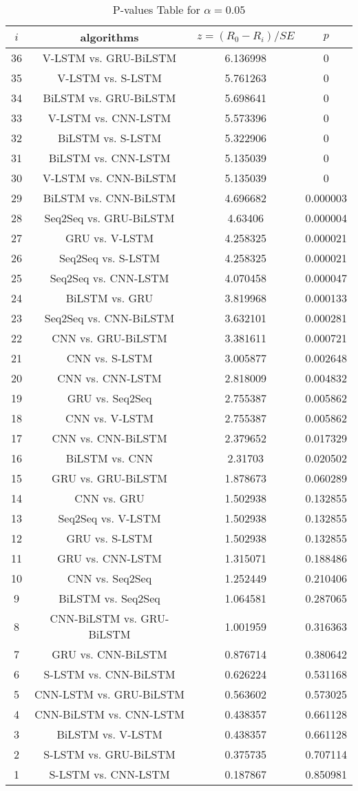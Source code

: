 \documentclass[a4paper,10pt]{article}
\begin{document}
\begin{landscape}
\begin{table}[!htp]
\centering\scriptsize
\begin{tabular}{cccc}
$i$&algorithms&$z=(R_0 - R_i)/SE$&$p$\\
\hline36&V-LSTM vs. GRU-BiLSTM&6.136998&0\\
35&V-LSTM vs. S-LSTM&5.761263&0\\
34&BiLSTM vs. GRU-BiLSTM&5.698641&0\\
33&V-LSTM vs. CNN-LSTM&5.573396&0\\
32&BiLSTM vs. S-LSTM&5.322906&0\\
31&BiLSTM vs. CNN-LSTM&5.135039&0\\
30&V-LSTM vs. CNN-BiLSTM&5.135039&0\\
29&BiLSTM vs. CNN-BiLSTM&4.696682&0.000003\\
28&Seq2Seq vs. GRU-BiLSTM&4.63406&0.000004\\
27&GRU vs. V-LSTM&4.258325&0.000021\\
26&Seq2Seq vs. S-LSTM&4.258325&0.000021\\
25&Seq2Seq vs. CNN-LSTM&4.070458&0.000047\\
24&BiLSTM vs. GRU&3.819968&0.000133\\
23&Seq2Seq vs. CNN-BiLSTM&3.632101&0.000281\\
22&CNN vs. GRU-BiLSTM&3.381611&0.000721\\
21&CNN vs. S-LSTM&3.005877&0.002648\\
20&CNN vs. CNN-LSTM&2.818009&0.004832\\
19&GRU vs. Seq2Seq&2.755387&0.005862\\
18&CNN vs. V-LSTM&2.755387&0.005862\\
17&CNN vs. CNN-BiLSTM&2.379652&0.017329\\
16&BiLSTM vs. CNN&2.31703&0.020502\\
15&GRU vs. GRU-BiLSTM&1.878673&0.060289\\
14&CNN vs. GRU&1.502938&0.132855\\
13&Seq2Seq vs. V-LSTM&1.502938&0.132855\\
12&GRU vs. S-LSTM&1.502938&0.132855\\
11&GRU vs. CNN-LSTM&1.315071&0.188486\\
10&CNN vs. Seq2Seq&1.252449&0.210406\\
9&BiLSTM vs. Seq2Seq&1.064581&0.287065\\
8&CNN-BiLSTM vs. GRU-BiLSTM&1.001959&0.316363\\
7&GRU vs. CNN-BiLSTM&0.876714&0.380642\\
6&S-LSTM vs. CNN-BiLSTM&0.626224&0.531168\\
5&CNN-LSTM vs. GRU-BiLSTM&0.563602&0.573025\\
4&CNN-BiLSTM vs. CNN-LSTM&0.438357&0.661128\\
3&BiLSTM vs. V-LSTM&0.438357&0.661128\\
2&S-LSTM vs. GRU-BiLSTM&0.375735&0.707114\\
1&S-LSTM vs. CNN-LSTM&0.187867&0.850981\\
\hline
\end{tabular}
\caption{P-values Table for $\alpha=0.05$}
\end{table}\pagebreak


\end{landscape}
\end{document}

